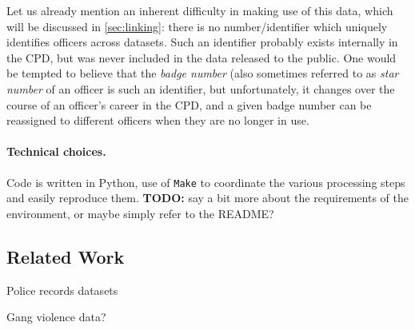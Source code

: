 Let us already mention an inherent difficulty in making use of this data, which
will be discussed in \cref{sec:linking}: there is no number/identifier which
uniquely identifies officers across datasets. Such an identifier probably
exists internally in the CPD, but was never included in the data released to
the public. One would be tempted to believe that the \emph{badge number} (also
sometimes referred to as \emph{star number} of an officer is such an
identifier, but unfortunately, it changes over the course of an officer's
career in the CPD, and a given badge number can be reassigned to different
officers when they are no longer in use.

\paragraph{Technical choices.} Code is written in Python, use of \texttt{Make}
to coordinate the various processing steps and easily reproduce them.
\textbf{TODO:} say a bit more about the requirements of the environment, or
maybe simply refer to the README?


\subsection{Related Work}

Police records datasets

Gang violence data?


